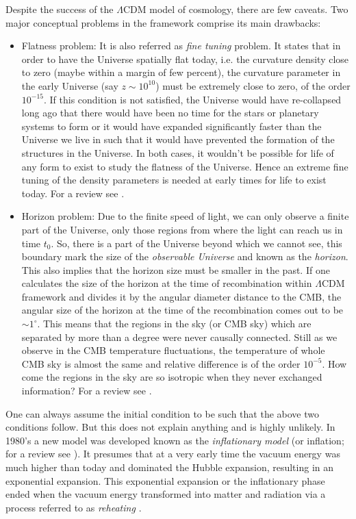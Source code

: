 Despite the success of the $\Lambda$CDM model of cosmology, there are few caveats.
Two major conceptual problems in the framework comprise its main drawbacks:

\begin{itemize}
	\item Flatness problem: It is also referred as {\it fine tuning} problem. It 
				states that in order to have the Universe spatially flat today, i.e.
				the curvature density close to zero (maybe within a margin of
				few percent), the curvature parameter in the early Universe (say 
				$z\sim10^{10}$) must be extremely close to zero, of the order $10^{-15}$.
				If this condition is not satisfied, the Universe would have re-collapsed
				long ago that there would have been no time for the stars or planetary systems to form
				or it would have expanded significantly faster than the Universe
				we live in such that it would have prevented the formation of the structures
				in the Universe. In both cases, it wouldn't be possible for life
				of any form to exist to study the flatness of the Universe. Hence
				an extreme fine tuning of the density parameters is needed at early
				times for life to exist today. For a review see \cite{2012PASA...29..395K}.

	\item Horizon problem: Due to the finite speed of light, we can only observe
				a finite part of the Universe, 
				only those regions from where the light can reach us
				in time $t_0$. So, there is a part of the Universe beyond which
				we cannot see, this boundary mark the size of the {\it observable Universe}
				and known as the {\it horizon}. This also implies that the horizon
				size must be smaller in the past. If one calculates the size of the
				horizon at the time of recombination within $\Lambda$CDM framework and
				divides it by the angular diameter distance to the CMB, the angular
				size of the horizon at the time of the recombination 
				comes out to be $\sim 1^{\circ}$. This means
				that the regions in the sky (or CMB sky) which are separated by 
				more than a degree were never causally connected. Still as
				we observe in the CMB temperature fluctuations, the temperature of
				whole CMB sky is almost the same and relative difference is of the 
				order $10^{-5}$. How come the regions in the sky are so isotropic
				when they never exchanged information? For a review see \cite{2012PASA...29..395K}.
\end{itemize}

One can always assume the initial condition to be such that the above two conditions
follow. But this does not explain anything and is highly unlikely. In 1980's 
a new model was developed known as the {\it inflationary model} (or inflation;
for a review see \cite{2001hep.ph....1119B,2003hep.ph....4257T,2006RvMP...78..537B}). It presumes
that at a very early time the vacuum energy was much higher than today and dominated
the Hubble expansion, resulting in an exponential expansion. This exponential
expansion or the inflationary phase ended when the vacuum energy transformed into
matter and radiation via a process referred to as {\it reheating \citep{2006RvMP...78..537B}}.

